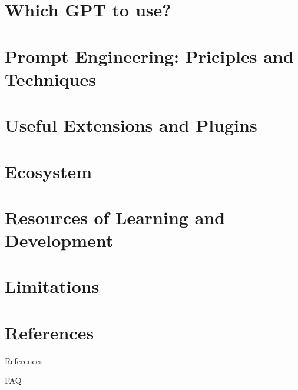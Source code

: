 \documentclass{beamer}
\begin{document}
\section{Which GPT to use?}
\section{Prompt Engineering: Priciples and Techniques}

\section{Useful Extensions and Plugins}
\begin{frame}{}
\end{frame}

\section{Ecosystem}
\section{Resources of Learning and Development}
\section{Limitations}



\section{References}
\begin{frame}[t,allowframebreaks]{References}
  \nocite{*}
  \RaggedRight
  \printbibliography
\end{frame}


\begin{frame}{FAQ}

\end{frame}
\end{document}
